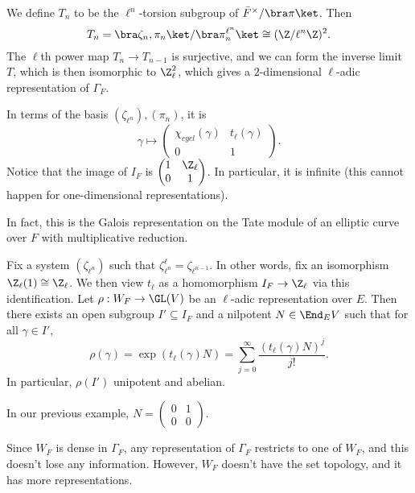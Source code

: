 \documentclass[a4paper]{article}
\begin{document}
\begin{eg}
  We define $T_n$ to be the $\ell^n$-torsion subgroup of $\bar{F}^\times/\bra \pi\ket$. Then
  \[
    T_n = \bra \zeta_n, \pi_n\ket / \bra \pi_n^{\ell^n}\ket \cong (\Z/\ell^n \Z)^2.
  \]
  The $\ell$th power map $T_n \to T_{n - 1}$ is surjective, and we can form the inverse limit $T$, which is then isomorphic to $\Z_{\ell}^2$, which gives a $2$-dimensional $\ell$-adic representation of $\Gamma_F$.

  In terms of the basis $(\zeta_{\ell^n}), (\pi_n)$, it is
  \[
    \gamma \mapsto 
    \begin{pmatrix}
      \chi_{cycl}(\gamma) & t_\ell(\gamma)\\
      0 & 1
    \end{pmatrix}.
  \]
  Notice that the image of $I_F$ is $\begin{pmatrix} 1 & \Z_\ell \\0 & 1\end{pmatrix}$. In particular, it is infinite (this cannot happen for one-dimensional representations).

  In fact, this is the Galois representation on the Tate module of an elliptic curve over $F$ with multiplicative reduction. %
\end{eg}
\begin{thm}
  Fix a system $(\zeta_{\ell^n})$ such that $\zeta_{\ell^n}^\ell = \zeta_{\ell^{n - 1}}$. In other words, fix an isomorphism $\Z_{\ell}(1) \cong \Z_\ell$. We then view $t_\ell$ as a homomorphism $I_F \to \Z_\ell$ via this identification. Let $\rho: W_F \to \GL(V)$ be an $\ell$-adic representation over $E$. Then there exists an open subgroup $I' \subseteq I_F$ and a nilpotent $N \in \End_E V$ such that for all $\gamma \in I'$,
  \[
    \rho(\gamma) = \exp (t_\ell(\gamma) N) = \sum_{j = 0}^\infty \frac{(t_\ell(\gamma) N)^j}{j!}.
  \]
  In particular, $\rho(I')$ unipotent and abelian.
\end{thm}
In our previous example, $N = \begin{pmatrix}0 & 1\\0 & 0\end{pmatrix}$.

Since $W_F$ is dense in $\Gamma_F$, any representation of $\Gamma_F$ restricts to one of $W_F$, and this doesn't lose any information. However, $W_F$ doesn't have the set topology, and it has more representations.
\end{document}
